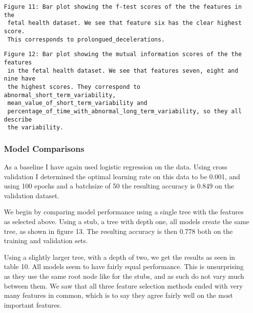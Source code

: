 \documentclass[11pt]{article}
\begin{document}
 \begin{Verbatim}[commandchars=\\\{\}]
 Figure 11: Bar plot showing the f-test scores of the the features in the 
 fetal health dataset. We see that feature six has the clear highest score. 
 This corresponds to prolongued_decelerations.
 \end{Verbatim}


 
 \begin{center}
 \end{center}
 \begin{Verbatim}[commandchars=\\\{\}]
 Figure 12: Bar plot showing the mutual information scores of the the  features 
 in the fetal health dataset. We see that features seven, eight and nine have 
 the highest scores. They correspond to abnormal_short_term_variability, 
 mean_value_of_short_term_variability and 
 percentage_of_time_with_abnormal_long_term_variability, so they all describe 
 the variability.
\end{Verbatim}
  
     \hypertarget{model-comparisons2}{%
 	\subsubsection{Model Comparisons}\label{model-comparisons2}}

As a baseline I have again used logistic regression on the data. Using cross validation I determined the optimal learning rate on this data to be 0.001, and using 100 epochs and a batchsize of 50 the resulting accuracy is 0.849 on the validation dataset.

We begin by comparing model performance using a single tree with the features as selected above. Using a stub, a tree with depth one, all models create the same tree, as shown in figure 13. The resulting accuracy is then 0.778 both on the training and validation sets.

Using a slightly larger tree, with a depth of two, we get the results as seen in table 10. All models seem to have fairly equal performance. This is unsurprising as they use the same root node like for the stubs, and as such do not vary much between them. We saw that all three feature selection methods ended with very many features in common, which is to say they agree fairly well on the most important features. 
\end{document}

